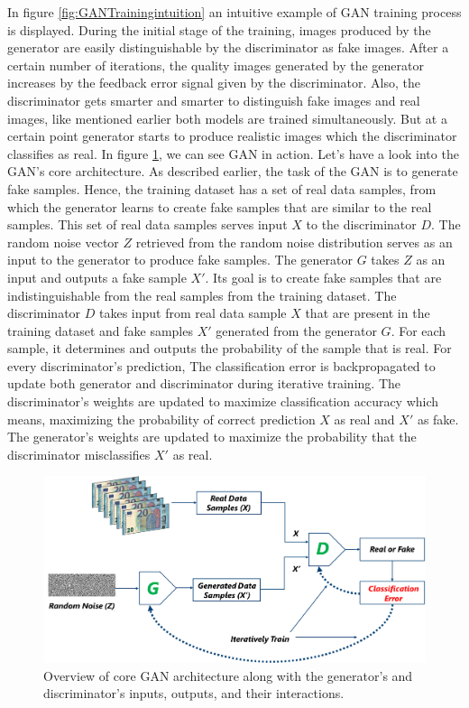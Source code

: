 In figure \ref{fig:GANTrainingintuition} an intuitive example of \ac{GAN} training process is displayed. During the initial stage of the training, images produced by the generator are easily distinguishable by the discriminator as fake images. After a certain number of iterations, the quality images generated by the generator increases by the feedback error signal given by the discriminator. Also, the discriminator gets smarter and smarter to distinguish fake images and real images, like mentioned earlier both models are trained simultaneously. But at a certain point generator starts to produce realistic images which the discriminator classifies as real. In figure \ref{fig:GANStructure}, we can see GAN in action. Let's have a look into the GAN's core architecture. As described earlier, the task of the GAN is to generate fake samples. Hence, the training dataset has a set of real data samples, from which the generator learns to create fake samples that are similar to the real samples. This set of real data samples serves input $X$ to the discriminator $D$. The random noise vector $Z$ retrieved from the random noise distribution serves as an input to the generator to produce fake samples. The generator $G$ takes $Z$ as an input and outputs a fake sample $X'$. Its goal is to create fake samples that are indistinguishable from the real samples from the training dataset. The discriminator $D$ takes input from real data sample $X$ that are present in the training dataset and fake samples $X'$ generated from the generator $G$. For each sample, it determines and outputs the probability of the sample that is real. For every discriminator's prediction, 
The classification error is backpropagated to update both generator and discriminator during iterative training. The discriminator's weights are updated to maximize classification accuracy which means, maximizing the probability of correct prediction $X$ as real and $X'$ as fake. The generator's weights are updated to maximize the probability that the discriminator misclassifies $X'$ as real.


\vspace*{0.5cm}
\begin{figure}[H]
        \begin{center}
	    \includegraphics[scale=0.30]{images/Fundamentals/GANStructure.png}
	    \caption[Overview of core \ac{GAN} architecture.]{Overview of core \ac{GAN} architecture along with the generator's and discriminator's inputs, outputs, and their interactions.}
	    \label{fig:GANStructure}
	    \end{center}
\end{figure}



